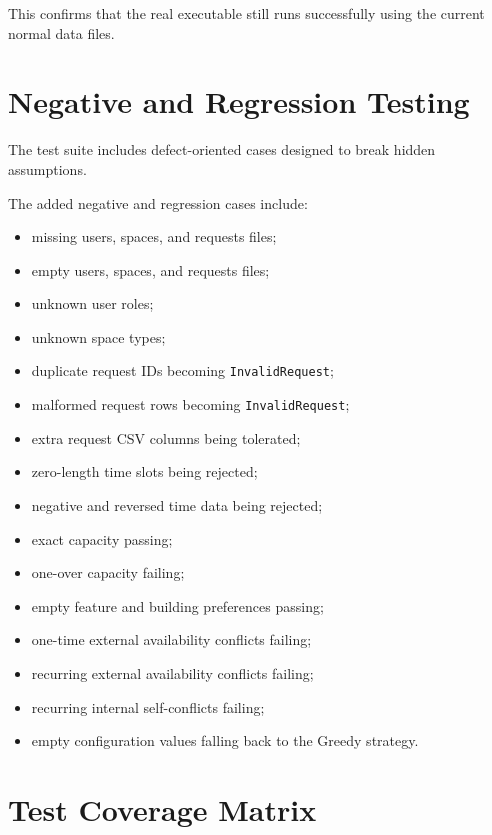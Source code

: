 \documentclass[12pt,a4paper]{article}
\begin{document}
This confirms that the real executable still runs successfully using the current normal data files.

\section{Negative and Regression Testing}

The test suite includes defect-oriented cases designed to break hidden assumptions.

The added negative and regression cases include:

\begin{itemize}
    \item missing users, spaces, and requests files;
    \item empty users, spaces, and requests files;
    \item unknown user roles;
    \item unknown space types;
    \item duplicate request IDs becoming \texttt{InvalidRequest};
    \item malformed request rows becoming \texttt{InvalidRequest};
    \item extra request CSV columns being tolerated;
    \item zero-length time slots being rejected;
    \item negative and reversed time data being rejected;
    \item exact capacity passing;
    \item one-over capacity failing;
    \item empty feature and building preferences passing;
    \item one-time external availability conflicts failing;
    \item recurring external availability conflicts failing;
    \item recurring internal self-conflicts failing;
    \item empty configuration values falling back to the Greedy strategy.
\end{itemize}

\section{Test Coverage Matrix}
\end{document}
